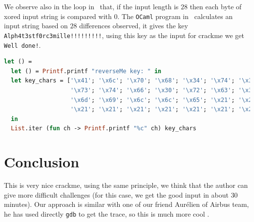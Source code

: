 \documentclass{easychair}
\begin{document}
We observe also in the loop in~ that, if the input length is $28$ then each byte of xored input string is compared with $0$. The \texttt{OCaml} program in~ calculates an input string based on $28$ differences observed, it gives the key \texttt{Alph4t3stf0rc3mille!!!!!!!!!}, using this key as the input for crackme we get \texttt{Well done!}.

\begin{lstlisting}[frame=single, caption={Calculate good input}, captionpos=b, boxpos=b, language=Caml, label=lst:keygen]
let () =
  let () = Printf.printf "reverseMe key: " in
  let key_chars = ['\x41'; '\x6c'; '\x70'; '\x68'; '\x34'; '\x74'; '\x33';
                   '\x73'; '\x74'; '\x66'; '\x30'; '\x72'; '\x63'; '\x33';
                   '\x6d'; '\x69'; '\x6c'; '\x6c'; '\x65'; '\x21'; '\x21';
                   '\x21'; '\x21'; '\x21'; '\x21'; '\x21'; '\x21'; '\x21']
  in
  List.iter (fun ch -> Printf.printf "%c" ch) key_chars
\end{lstlisting}



\section{Conclusion}
This is very nice crackme, using the same principle, we think that the author can give more difficult challenges (for this case, we get the good input in about $30$ minutes). Our approach is similar with one of our friend Aurélien of Airbus team, he has used directly \texttt{gdb} to get the trace, so this is much more cool \smiley{}. 

\printbibliography
\end{document}
